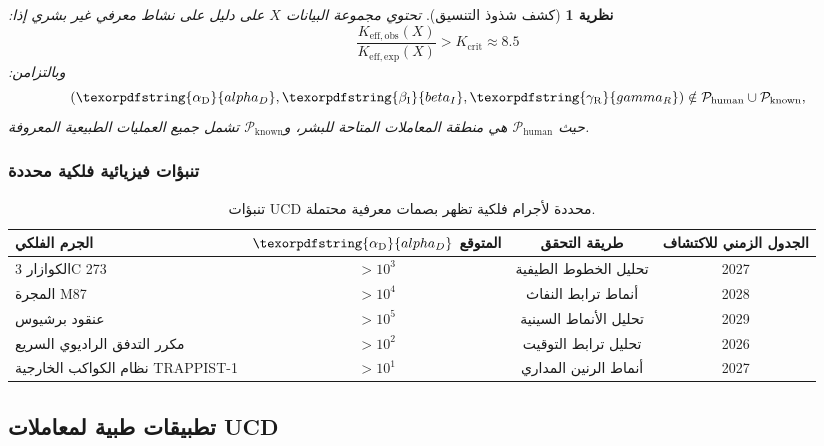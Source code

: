 \documentclass[12pt,a4paper]{article}
\newtheorem{theorem}{نظرية}
\DeclareRobustCommand{\alD}{\texorpdfstring{\ensuremath{\alpha_{\mathrm{D}}}}{alpha_D}}
\DeclareRobustCommand{\beI}{\texorpdfstring{\ensuremath{\beta_{\mathrm{I}}}}{beta_I}}
\DeclareRobustCommand{\gaR}{\texorpdfstring{\ensuremath{\gamma_{\mathrm{R}}}}{gamma_R}}
\newcommand{\eff}{\mathrm{eff}}
\newcommand{\Keobs}{K_{\eff,\mathrm{obs}}}
\newcommand{\Keexp}{K_{\eff,\mathrm{exp}}}
\newcommand{\Kcrit}{K_{\mathrm{crit}}}
\begin{document}
	\begin{theorem}[كشف شذوذ التنسيق]
		تحتوي مجموعة البيانات \(X\) على دليل على نشاط معرفي غير بشري إذا:
		\[
		\frac{\Keobs(X)}{\Keexp(X)} > \Kcrit \approx 8.5
		\]
		وبالتزامن:
		\[
		(\alD, \beI, \gaR) \notin \mathcal{P}_{\mathrm{human}} \cup \mathcal{P}_{\mathrm{known}},
		\]
		حيث \(\mathcal{P}_{\mathrm{human}}\) هي منطقة المعاملات المتاحة للبشر، و\(\mathcal{P}_{\mathrm{known}}\) تشمل جميع العمليات الطبيعية المعروفة.
	\end{theorem}
	
	\subsubsection{تنبؤات فيزيائية فلكية محددة}
	
	\begin{table}[ht]
		\centering
		\scriptsize
		\begin{tabular}{lccc}
			\toprule
			\textbf{الجرم الفلكي} & \textbf{\(\alD\) المتوقع} & \textbf{طريقة التحقق} & \textbf{الجدول الزمني للاكتشاف} \\
			\midrule
			الكوازار 3C 273 & \(>10^3\) & تحليل الخطوط الطيفية & 2027 \\
			المجرة M87 & \(>10^4\) & أنماط ترابط النفاث & 2028 \\
			عنقود برشيوس & \(>10^5\) & تحليل الأنماط السينية & 2029 \\
			مكرر التدفق الراديوي السريع & \(>10^2\) & تحليل ترابط التوقيت & 2026 \\
			نظام الكواكب الخارجية TRAPPIST-1 & \(>10^1\) & أنماط الرنين المداري & 2027 \\
			\bottomrule
		\end{tabular}
		\caption{تنبؤات UCD محددة لأجرام فلكية تظهر بصمات معرفية محتملة.}
		\label{tab:astro-predictions}
	\end{table}
	
	\subsection{تطبيقات طبية لمعاملات UCD}
	
\end{document}
